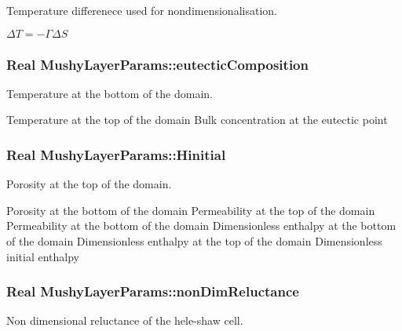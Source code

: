Temperature differenece used for nondimensionalisation. 

$ \Delta T = - \Gamma \Delta S $ \hypertarget{class_mushy_layer_params_a0bda0637f2ed28646edd079ebc2e3f71}{
\subsubsection[{eutectic\-Composition}]{\setlength{\rightskip}{0pt plus 5cm}Real Mushy\-Layer\-Params\-::eutectic\-Composition}}\label{class_mushy_layer_params_a0bda0637f2ed28646edd079ebc2e3f71}


Temperature at the bottom of the domain. 

Temperature at the top of the domain Bulk concentration at the eutectic point \hypertarget{class_mushy_layer_params_ab2e1279e2b97f6b6bfbd79aef9f4fd07}{
\subsubsection[{Hinitial}]{\setlength{\rightskip}{0pt plus 5cm}Real Mushy\-Layer\-Params\-::\-Hinitial}}\label{class_mushy_layer_params_ab2e1279e2b97f6b6bfbd79aef9f4fd07}


Porosity at the top of the domain. 

Porosity at the bottom of the domain Permeability at the top of the domain Permeability at the bottom of the domain Dimensionless enthalpy at the bottom of the domain Dimensionless enthalpy at the top of the domain Dimensionless initial enthalpy \hypertarget{class_mushy_layer_params_a157dde93ce7d9c83740fb9fc7fc0aadd}{
\subsubsection[{non\-Dim\-Reluctance}]{\setlength{\rightskip}{0pt plus 5cm}Real Mushy\-Layer\-Params\-::non\-Dim\-Reluctance}}\label{class_mushy_layer_params_a157dde93ce7d9c83740fb9fc7fc0aadd}


Non dimensional reluctance of the hele-\/shaw cell. 

